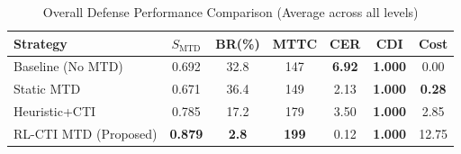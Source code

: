 \begin{table}[!t]
\centering
\caption{Overall Defense Performance Comparison (Average across all levels)}
\label{tab:overall_performance}
\renewcommand{\arraystretch}{1.1}
\begin{tabular}{@{}lcccccc@{}}
\toprule
\textbf{Strategy} & $S_{\mathrm{MTD}}$ & \textbf{BR(\%)} & \textbf{MTTC} & \textbf{CER} & \textbf{CDI} & \textbf{Cost} \\
\midrule
Baseline (No MTD) & 0.692 & 32.8 & 147 & \textbf{6.92} & \textbf{1.000} & 0.00 \\
Static MTD & 0.671 & 36.4 & 149 & 2.13 & \textbf{1.000} & \textbf{0.28} \\
Heuristic+CTI & 0.785 & 17.2 & 179 & 3.50 & \textbf{1.000} & 2.85 \\
RL-CTI MTD (Proposed) & \textbf{0.879} & \textbf{2.8} & \textbf{199} & 0.12 & \textbf{1.000} & 12.75 \\
\bottomrule
\end{tabular}
\end{table}

